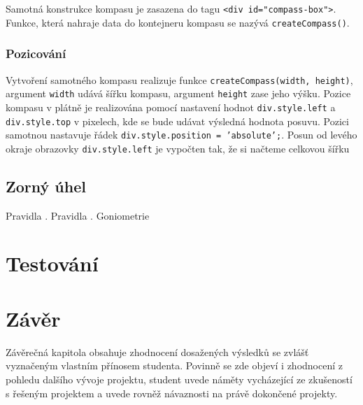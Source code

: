 Samotná konstrukce kompasu je zasazena do tagu \texttt{<div id="compass-box">}. Funkce, která nahraje data do kontejneru kompasu se nazývá \texttt{createCompass()}.

\subsection{Pozicování}
Vytvoření samotného kompasu realizuje funkce \texttt{createCompass(width, height)}, argument \texttt{width} udává šířku kompasu, argument \texttt{height} zase jeho výšku. Pozice kompasu v plátně je realizována pomocí nastavení hodnot \texttt{div.style.left} a 
\texttt{div.style.top} v pixelech, kde se bude udávat výsledná hodnota posuvu. Pozici samotnou nastavuje řádek \texttt{div.style.position = 'absolute';}. Posun  od levého okraje obrazovky \texttt{div.style.left} je vypočten tak, že si načteme celkovou šířku

\newpage

\section{Zorný úhel}


Pravidla \cite{Kompendium}. Pravidla \cite{Goniometrie}. 
Goniometrie
\chapter{Testování}
\label{chapter:5}


\chapter{Závěr}
\label{chapter:6}

Závěrečná kapitola obsahuje zhodnocení dosažených výsledků se zvlášť vyznačeným vlastním přínosem studenta. Povinně se zde objeví i zhodnocení z pohledu dalšího vývoje projektu, student uvede náměty vycházející ze zkušeností s řešeným projektem a uvede rovněž návaznosti na právě dokončené projekty.

